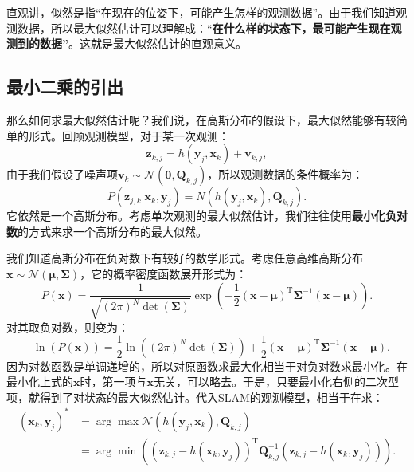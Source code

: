 直观讲，似然是指“在现在的位姿下，可能产生怎样的观测数据”。由于我们知道观测数据，所以最大似然估计可以理解成：“\textbf{在什么样的状态下，最可能产生现在观测到的数据”}。这就是最大似然估计的直观意义。

\subsection{最小二乘的引出}
那么如何求最大似然估计呢？我们说，在高斯分布的假设下，最大似然能够有较简单的形式。回顾观测模型，对于某一次观测：
\[
{\bm{z}_{k,j}} = h\left( {{ \bm{y}_j},{ \bm{x}_k}}  \right)+ \bm{v}_{k,j},
\]
由于我们假设了噪声项${\bm{v}_k} \sim \mathcal{N}\left( {\bm{0},{{{\bm{Q}}}_{k,j}}} \right)$，所以观测数据的条件概率为：
\[
P( \bm{z}_{j,k} | \bm{x}_k, \bm{y}_j ) = N\left( h(\bm{y}_j, \bm{x}_k), \bm{Q}_{k,j} \right).
\]
它依然是一个高斯分布。考虑单次观测的最大似然估计，我们往往使用\textbf{最小化负对数}的方式来求一个高斯分布的最大似然。

我们知道高斯分布在负对数下有较好的数学形式。考虑任意高维高斯分布$\bm{x} \sim \mathcal{N}(\bm{\mu}, \bm{\Sigma})$，它的概率密度函数展开形式为：
\begin{equation}
P\left( \bm{x} \right) = \frac{1}{{\sqrt {{{(2\pi )}^N}\det ( \bm{\Sigma} )} }}\exp \left( { - \frac{1}{2}{{\left( { \bm{x} - \bm{\mu} } \right)}^\mathrm{T}}{ \bm{\Sigma} ^{ - 1}}\left( { \bm{x} - \bm{\mu} } \right)} \right).
\end{equation}
对其取负对数，则变为：
\begin{equation}
- \ln \left( {P\left( \bm{x} \right)} \right) = \frac{1}{2}\ln \left( {{{\left( {2\pi } \right)}^N}\det \left( \bm{\Sigma}  \right)} \right) + \frac{1}{2}{\left( { \bm{x} - \bm{\mu} } \right)^\mathrm{T}}{\bm{\Sigma} ^{ - 1}}\left( {\bm{x} - \bm{\mu} } \right).
\end{equation}
因为对数函数是单调递增的，所以对原函数求最大化相当于对负对数求最小化。在最小化上式的$\bm{x}$时，第一项与$\bm{x}$无关，可以略去。于是，只要最小化右侧的二次型项，就得到了对状态的最大似然估计。代入SLAM的观测模型，相当于在求：
\begin{equation}
\begin{aligned}
(\bm{x}_k,\bm{y}_j)^* &= \arg \max \mathcal{N}(h(\bm{y}_j, \bm{x}_k), \bm{Q}_{k,j}) \\ &=  \arg \min \left( {{{\left( {{ \bm{z}_{k,j}} - h\left( {{\bm{x}_k},{\bm{y}_j}} \right)} \right)}^\mathrm{T}} \bm{Q}_{k,j}^{ - 1}\left( {{\bm{z}_{k,j}} - h\left( {{\bm{x}_k},{\bm{y}_j}} \right)} \right)} \right).
\end{aligned}
\end{equation}

